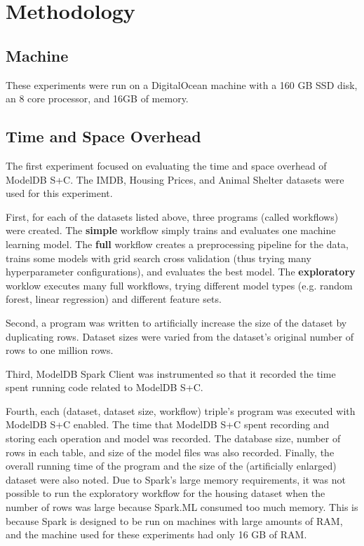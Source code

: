 \section{Methodology}
\subsection{Machine}
These experiments were run on a DigitalOcean machine with a 160 GB SSD disk, an 8 core processor,
and 16GB of memory.

\subsection{Time and Space Overhead}
The first experiment focused on evaluating the time and space overhead of ModelDB S+C.
The IMDB, Housing Prices, and Animal Shelter datasets were used for this experiment. 

First, for each of the datasets listed above, three programs (called workflows) were
created. The \textbf{simple} workflow simply trains and evaluates one machine learning model. 
The \textbf{full} workflow creates a preprocessing pipeline for the data, trains 
some models with grid search cross validation (thus trying many hyperparameter configurations), 
and evaluates the best model. The \textbf{exploratory} worklow executes many full workflows, 
trying different model types (e.g. random forest, linear regression) and different feature sets.

Second, a program was written to artificially increase the size of the dataset by duplicating rows.
Dataset sizes were varied from the dataset's original number of rows to one million rows.

Third, ModelDB Spark Client was instrumented so that it recorded the time spent running code related
to ModelDB S+C.

Fourth, each (dataset, dataset size, workflow) triple's program was executed with ModelDB S+C enabled. The time that ModelDB S+C spent
recording and storing each operation and model was recorded. The database size, number of rows in each table, and size of the model
files was also recorded. Finally, the overall running time of the program and the size of the (artificially enlarged) dataset
were also noted. Due to Spark's large memory requirements, it was not possible to run the exploratory workflow for the 
housing dataset when the number of rows was large because Spark.ML consumed too much memory. This is because Spark is designed
to be run on machines with large amounts of RAM, and the machine used for these experiments had only 16 GB of RAM.

